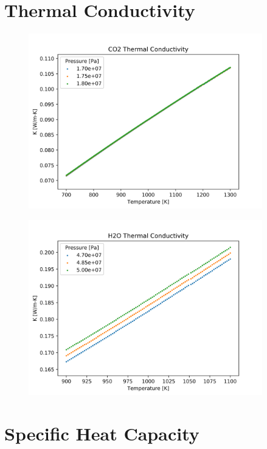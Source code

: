 \newpage
\section{Thermal Conductivity}

\begin{figure}[h]
    \centering
    \includegraphics[width=4in]{../images/property_plots/CO2_Thermal_Conductivity.png}
\end{figure}

\begin{figure}[h]
    \centering
    \includegraphics[width=4in]{../images/property_plots/H2O_Thermal_Conductivity.png}
\end{figure}

\newpage
\section{Specific Heat Capacity}

